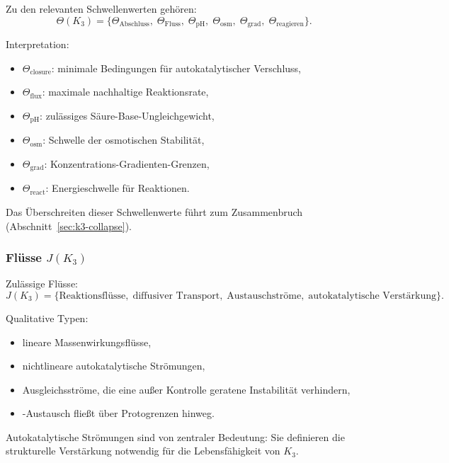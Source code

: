 Zu den relevanten Schwellenwerten gehören:
\[
\Theta(K_3) =
\{\Theta_{\mathrm{Abschluss}},\;
  \Theta_{\mathrm{Fluss}},\;
  \Theta_{\mathrm{pH}},\;
  \Theta_{\mathrm{osm}},\;
  \Theta_{\mathrm{grad}},\;
  \Theta_{\mathrm{reagieren}}\}.
\]

Interpretation:
\begin{itemize}
    \item $\Theta_{\mathrm{closure}}$: minimale Bedingungen für
          autokatalytischer Verschluss,
    \item $\Theta_{\mathrm{flux}}$: maximale nachhaltige Reaktionsrate,
    \item $\Theta_{\mathrm{pH}}$: zulässiges Säure-Base-Ungleichgewicht,
    \item $\Theta_{\mathrm{osm}}$: Schwelle der osmotischen Stabilität,
    \item $\Theta_{\mathrm{grad}}$: Konzentrations-Gradienten-Grenzen,
    \item $\Theta_{\mathrm{react}}$: Energieschwelle für Reaktionen.
\end{itemize}

Das Überschreiten dieser Schwellenwerte führt zum Zusammenbruch (Abschnitt~\ref{sec:k3-collapse}).

\subsubsection{Flüsse \texorpdfstring{$J(K_3)$}{J(K_3)}}

Zulässige Flüsse:
\[
J(K_3) = \{\text{Reaktionsflüsse},\; \text{diffusiver Transport},\;
         \text{Austauschströme},\; \text{autokatalytische Verstärkung}\}.
\]

Qualitative Typen:
\begin{itemize}
    \item lineare Massenwirkungsflüsse,
    \item nichtlineare autokatalytische Strömungen,
    \item Ausgleichsströme, die eine außer Kontrolle geratene Instabilität verhindern,
    \item-Austausch fließt über Protogrenzen hinweg.
\end{itemize}

Autokatalytische Strömungen sind von zentraler Bedeutung: Sie definieren die strukturelle Verstärkung
notwendig für die Lebensfähigkeit von $K_3$.


